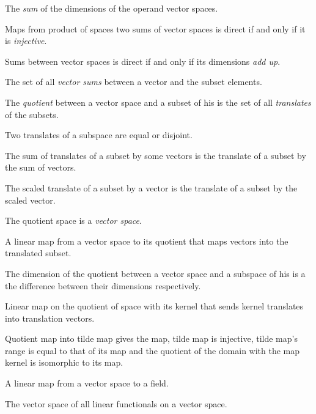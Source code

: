 \begin{multicols}{3}
  The \textit{sum} of the dimensions of the operand vector spaces.

  Maps from product of spaces two sums of vector spaces is direct if and only if it is \textit{injective}.

  Sums between vector spaces is direct if and only if its dimensions \textit{add up}.

  The set of all \textit{vector sums} between a vector and the subset elements.

  The \textit{quotient} between a vector space and a subset of his is the set of all
  \textit{translates} of the subsets.

  Two translates of a subspace are equal or disjoint.

  The sum of translates of a subset by some vectors
  is the translate of a subset by the sum of vectors.
  
  The scaled translate of a subset by a vector
  is the translate of a subset by the scaled vector.

  The quotient space is a \textit{vector space}.

  A linear map from a vector space to its quotient that maps vectors
  into the translated subset.

  The dimension of the quotient between a vector space and a subspace of his
  is a the difference between their dimensions respectively.

  Linear map on the quotient of space with its kernel that
  sends kernel translates into translation vectors.

  Quotient map into tilde map gives the map, tilde map is injective,
  tilde map's range is equal to that of its map and
  the quotient of the domain with the map kernel is isomorphic
  to its map.


  A linear map from a vector space to a field.

  The vector space of all linear functionals on a vector space.


\end{multicols}
